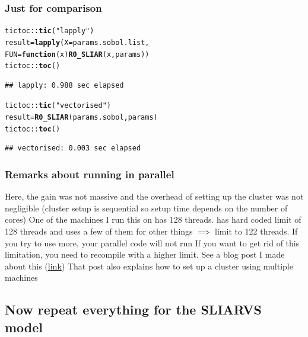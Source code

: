 \documentclass[aspectratio=169]{beamer}\usepackage[]{graphicx}\usepackage[]{xcolor}
\makeatletter
\newcommand{\hlsng}[1]{\textcolor[rgb]{0.192,0.494,0.8}{#1}}%
\newcommand{\hlopt}[1]{\textcolor[rgb]{0,0,0}{#1}}%
\newcommand{\hldef}[1]{\textcolor[rgb]{0.345,0.345,0.345}{#1}}%
\newcommand{\hlkwa}[1]{\textcolor[rgb]{0.161,0.373,0.58}{\textbf{#1}}}%
\newcommand{\hlkwb}[1]{\textcolor[rgb]{0.69,0.353,0.396}{#1}}%
\newcommand{\hlkwc}[1]{\textcolor[rgb]{0.333,0.667,0.333}{#1}}%
\newcommand{\hlkwd}[1]{\textcolor[rgb]{0.737,0.353,0.396}{\textbf{#1}}}%
\newenvironment{kframe}{%
 \def\at@end@of@kframe{}%
 \ifinner\ifhmode%
  \def\at@end@of@kframe{\end{minipage}}%
  \begin{minipage}{\columnwidth}%
 \fi\fi%
 \def\FrameCommand##1{\hskip\@totalleftmargin \hskip-\fboxsep
 \colorbox{shadecolor}{##1}\hskip-\fboxsep
     \hskip-\linewidth \hskip-\@totalleftmargin \hskip\columnwidth}%
 \MakeFramed {\advance\hsize-\width
   \@totalleftmargin\z@ \linewidth\hsize
   \@setminipage}}%
 {\par\unskip\endMakeFramed%
 \at@end@of@kframe}
\newenvironment{knitrout}{}{} %
\makeatother
\begin{document}
\begin{frame}[fragile]\frametitle{Just for comparison}
\begin{knitrout}
\color{fgcolor}\begin{kframe}
\begin{alltt}
\hldef{tictoc}\hlopt{::}\hlkwd{tic}\hldef{(}\hlsng{"lapply"}\hldef{)}
\hldef{result} \hlkwb{=} \hlkwd{lapply}\hldef{(}\hlkwc{X} \hldef{= params.sobol.list,}
                \hlkwc{FUN} \hldef{=}  \hlkwa{function}\hldef{(}\hlkwc{x}\hldef{)} \hlkwd{R0_SLIAR}\hldef{(x, params))}
\hldef{tictoc}\hlopt{::}\hlkwd{toc}\hldef{()}
\end{alltt}
\begin{verbatim}
## lapply: 0.988 sec elapsed
\end{verbatim}
\begin{alltt}
\hldef{tictoc}\hlopt{::}\hlkwd{tic}\hldef{(}\hlsng{"vectorised"}\hldef{)}
\hldef{result} \hlkwb{=} \hlkwd{R0_SLIAR}\hldef{(params.sobol, params)}
\hldef{tictoc}\hlopt{::}\hlkwd{toc}\hldef{()}
\end{alltt}
\begin{verbatim}
## vectorised: 0.003 sec elapsed
\end{verbatim}
\end{kframe}
\end{knitrout}
\end{frame}


\begin{frame}\frametitle{Remarks about running in parallel}
Here, the gain was not massive and the overhead of setting up the cluster was not negligible (cluster setup is sequential so setup time depends on the number of cores)
\vfill
One of the machines I run this on has 128 threads.  has hard coded limit of 128 threads and uses a few of them for other things $\implies$ limit to 122 threads. If you try to use more, your parallel code will not run
\vfill
If you want to get rid of this limitation, you need to recompile  with a higher limit. See a blog post I made about this (\href{https://julien-arino.github.io/blog/2023/R-on-raspberri-pi-and-more-than-128-threads/}{link})
\vfill
That post also explains how to set up a cluster using multiple machines
\end{frame}

\subsection{Now repeat everything for the SLIARVS model}
\end{document}
